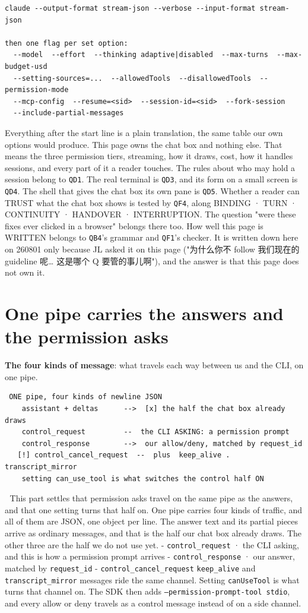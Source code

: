 \begin{verbatim}
claude --output-format stream-json --verbose --input-format stream-json

then one flag per set option:
  --model  --effort  --thinking adaptive|disabled  --max-turns  --max-budget-usd
  --setting-sources=...  --allowedTools  --disallowedTools  --permission-mode
  --mcp-config  --resume=<sid>  --session-id=<sid>  --fork-session
  --include-partial-messages
\end{verbatim}
Everything after the start line is a plain translation, the same table our own options would produce. This page owns the chat box and nothing else. That means the three permission tiers, streaming, how it draws, cost, how it handles sessions, and every part of it a reader touches. The rules about who may hold a session belong to \texttt{QD1}. The real terminal is \texttt{QD3}, and its form on a small screen is \texttt{QD4}. The shell that gives the chat box its own pane is \texttt{QD5}. Whether a reader can TRUST what the chat box shows is tested by \texttt{QF4}, along BINDING · TURN · CONTINUITY · HANDOVER · INTERRUPTION. The question "were these fixes ever clicked in a browser" belongs there too. How well this page is WRITTEN belongs to \texttt{QB4}'s grammar and \texttt{QF1}'s checker. It is written down here on 260801 only because JL asked it on this page ("为什么你不 follow 我们现在的 guideline 呢… 这是哪个 Q 要管的事儿啊"), and the answer is that this page does not own it.


\section{One pipe carries the answers and the permission asks}
\textbf{The four kinds of message}: what travels each way between us and the CLI, on one pipe.

\begin{verbatim}
 ONE pipe, four kinds of newline JSON
    assistant + deltas      -->  [x] the half the chat box already draws
    control_request         --  the CLI ASKING: a permission prompt
    control_response        -->  our allow/deny, matched by request_id
   [!] control_cancel_request  --  plus  keep_alive .  transcript_mirror
    setting can_use_tool is what switches the control half ON
\end{verbatim}
📌 This part settles that permission asks travel on the same pipe as the answers, and that one setting turns that half on. One pipe carries four kinds of traffic, and all of them are JSON, one object per line. The answer text and its partial pieces arrive as ordinary messages, and that is the half our chat box already draws. The other three are the half we do not use yet. - \texttt{control\_request} · the CLI asking, and this is how a permission prompt arrives - \texttt{control\_response} · our answer, matched by \texttt{request\_id} - \texttt{control\_cancel\_request} \texttt{keep\_alive} and \texttt{transcript\_mirror} messages ride the same channel. Setting \texttt{canUseTool} is what turns that channel on. The SDK then adds \texttt{--permission-prompt-tool stdio}, and every allow or deny travels as a control message instead of on a side channel.


